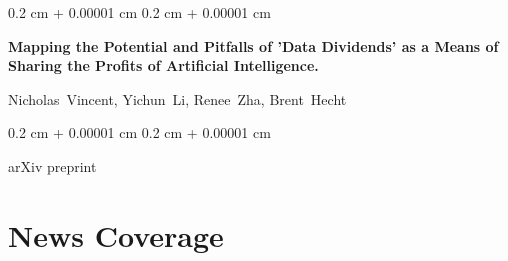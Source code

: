 \documentclass[10pt, letterpaper]{article}
\newenvironment{onecolentry}{
    \begin{adjustwidth}{
        0.2 cm + 0.00001 cm
    }{
        0.2 cm + 0.00001 cm
    }
}{
    \end{adjustwidth}
} %
\newenvironment{twocolentry}[2][]{
    \onecolentry
    \def\secondColumn{#2}
    \setcolumnwidth{\fill, 4.1 cm}
    \begin{paracol}{2}
}{
    \switchcolumn \raggedleft \secondColumn
    \end{paracol}
    \endonecolentry
} %
\begin{document}
        \begin{samepage}
            \begin{twocolentry}{
                2019
            }
                \textbf{Mapping the Potential and Pitfalls of 'Data Dividends' as a Means of Sharing the Profits of Artificial Intelligence.}

                \vspace{0.10 cm}

                \mbox{Nicholas Vincent}, \mbox{Yichun Li}, \mbox{Renee Zha}, \mbox{Brent Hecht}
            \end{twocolentry}


            \vspace{0.10 cm}

            \begin{onecolentry}
        arXiv preprint    \end{onecolentry}
        \end{samepage}


    
    \section{News Coverage}
\end{document}

